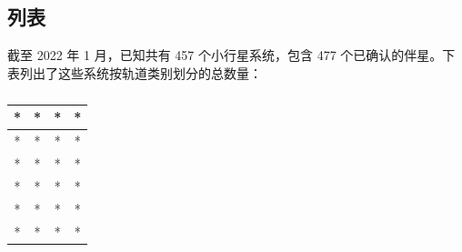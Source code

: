 \subsection{列表}
截至 2022 年 1 月，已知共有 457 个小行星系统，包含 477 个已确认的伴星。下表列出了这些系统按轨道类别划分的总数量：
\begin{table}[ht]
\centering
\caption{}\label{tab_Minor1}
\begin{tabular}{|c|c|c|c|}
\hline
* & * & * & * \\
\hline
* & * & * & * \\
\hline
* & * & * & * \\
\hline
* & * & * & * \\
\hline
* & * & * & * \\
\hline
* & * & * & * \\
\hline
\end{tabular}
\end{table}